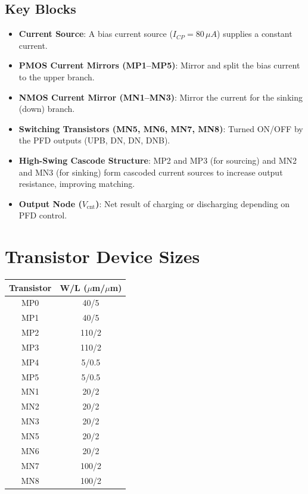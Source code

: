 \begin{itemize}
\subsection*{Key Blocks}
\begin{itemize}
    \item \textbf{Current Source}: A bias current source ($I_{CP} = 80\,\mu A$) supplies a constant current.
    \item \textbf{PMOS Current Mirrors (MP1--MP5)}: Mirror and split the bias current to the upper branch.
    \item \textbf{NMOS Current Mirror (MN1--MN3)}: Mirror the current for the sinking (down) branch.
    \item \textbf{Switching Transistors (MN5, MN6, MN7, MN8)}: Turned ON/OFF by the PFD outputs (UPB, DN, DN, DNB).
    \item \textbf{High-Swing Cascode Structure}: MP2 and MP3 (for sourcing) and MN2 and MN3 (for sinking) form cascoded current sources to increase output resistance, improving matching.
    \item \textbf{Output Node ($V_{\text{cnt}}$)}: Net result of charging or discharging depending on PFD control.
\end{itemize}

\section{Transistor Device Sizes}
\begin{center}
\begin{tabular}{|c|c|}
\hline
\textbf{Transistor} & \textbf{W/L ($\mu$m/$\mu$m)} \\ \hline
MP0 & 40/5 \\ \hline
MP1 & 40/5 \\ \hline
MP2 & 110/2 \\ \hline
MP3 & 110/2 \\ \hline
MP4 & 5/0.5 \\ \hline
MP5 & 5/0.5 \\ \hline
MN1 & 20/2 \\ \hline
MN2 & 20/2 \\ \hline
MN3 & 20/2 \\ \hline
MN5 & 20/2 \\ \hline
MN6 & 20/2 \\ \hline
MN7 & 100/2 \\ \hline
MN8 & 100/2 \\ \hline
\end{tabular}
\end{center}


\end{itemize}
